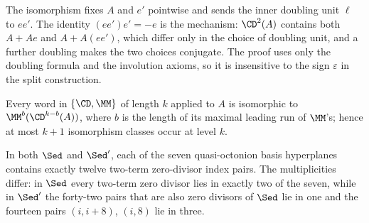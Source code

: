 \begin{remark}
The isomorphism fixes $A$ and $e'$ pointwise and sends the inner doubling unit
$\ell$ to $ee'$. The identity $(ee')e'=-e$ is the mechanism: $\CD^2(A)$ contains
both $A+Ae$ and $A+A(ee')$, which differ only in the choice of doubling unit, and
a further doubling makes the two choices conjugate. The proof uses only the
doubling formula and the involution axioms, so it is insensitive to the sign
$\varepsilon$ in the split construction.
\end{remark}

\begin{corollary}
Every word in $\{\CD,\MM\}$ of length $k$ applied to $A$ is isomorphic to
$\MM^{b}(\CD^{k-b}(A))$, where $b$ is the length of its maximal leading run of
$\MM$'s; hence at most $k+1$ isomorphism classes occur at level $k$.
\end{corollary}


\begin{proposition}\label{prop:incidence}
In both $\Sed$ and $\Sed'$, each of the seven quasi-octonion basis hyperplanes
contains exactly twelve two-term zero-divisor index pairs. The multiplicities
differ: in $\Sed$ every two-term zero divisor lies in exactly two of the seven,
while in $\Sed'$ the forty-two pairs that are also zero divisors of $\Sed$ lie in
one and the fourteen pairs $(i,i+8)$, $(i,8)$ lie in three.
\end{proposition}

